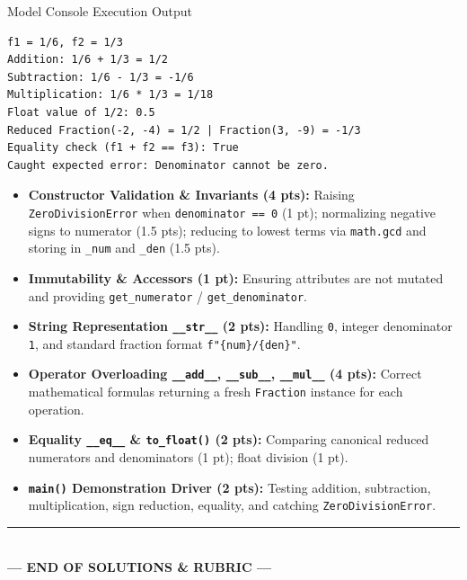 \documentclass[11pt,a4paper]{article}
\begin{document}
\begin{solbox}{Model Console Execution Output}
\begin{verbatim}
f1 = 1/6, f2 = 1/3
Addition: 1/6 + 1/3 = 1/2
Subtraction: 1/6 - 1/3 = -1/6
Multiplication: 1/6 * 1/3 = 1/18
Float value of 1/2: 0.5
Reduced Fraction(-2, -4) = 1/2 | Fraction(3, -9) = -1/3
Equality check (f1 + f2 == f3): True
Caught expected error: Denominator cannot be zero.
\end{verbatim}
\end{solbox}

\begin{rubricbox}
\begin{itemize}[leftmargin=1.5em,itemsep=1.5pt]
\item \textbf{Constructor Validation \& Invariants (4 pts):} Raising \texttt{ZeroDivisionError} when \texttt{denominator == 0} (1 pt); normalizing negative signs to numerator (1.5 pts); reducing to lowest terms via \texttt{math.gcd} and storing in \texttt{\_num} and \texttt{\_den} (1.5 pts).
\item \textbf{Immutability \& Accessors (1 pt):} Ensuring attributes are not mutated and providing \texttt{get\_numerator} / \texttt{get\_denominator}.
\item \textbf{String Representation \texttt{\_\_str\_\_} (2 pts):} Handling \texttt{0}, integer denominator \texttt{1}, and standard fraction format \texttt{f"\{num\}/\{den\}"}.
\item \textbf{Operator Overloading \texttt{\_\_add\_\_}, \texttt{\_\_sub\_\_}, \texttt{\_\_mul\_\_} (4 pts):} Correct mathematical formulas returning a fresh \texttt{Fraction} instance for each operation.
\item \textbf{Equality \texttt{\_\_eq\_\_} \& \texttt{to\_float()} (2 pts):} Comparing canonical reduced numerators and denominators (1 pt); float division (1 pt).
\item \textbf{\texttt{main()} Demonstration Driver (2 pts):} Testing addition, subtraction, multiplication, sign reduction, equality, and catching \texttt{ZeroDivisionError}.
\end{itemize}
\end{rubricbox}

\vfill
\begin{center}\rule{0.5\textwidth}{0.4pt}\\[1mm]
\textbf{\color{primaryblue}--- END OF SOLUTIONS \& RUBRIC ---}
\end{center}
\end{document}

